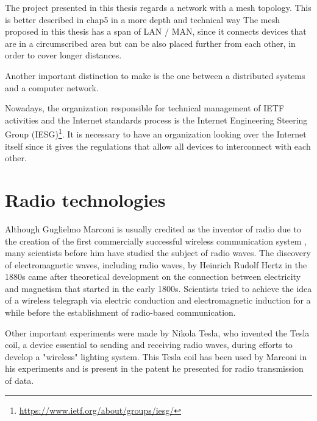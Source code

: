 	The project presented in this thesis regards a network with a mesh topology.
	This is better described in chap5 in a more depth and technical way
	The mesh proposed in this thesis has a span of LAN / MAN, since it connects devices that are in a circumscribed area but can be also placed further from each other, in order to cover longer distances.
	
	Another important distinction to make is the one between a distributed systems and a computer network.
	
	Nowadays, the organization responsible for technical management of IETF activities and the Internet standards process is the Internet Engineering Steering Group (IESG)\footnote{\url{https://www.ietf.org/about/groups/iesg/}}.
	It is necessary to have an organization looking over the Internet itself since it gives the regulations that allow all devices to interconnect with each other.
	
	\newpage	

\section{Radio technologies}\label{sec:radio_tech}
	
	Although Guglielmo Marconi is usually credited as the inventor of radio due to the creation of the first commercially successful wireless communication system \cite{4137304}, many scientists before him have studied the subject of radio waves.
	The discovery of electromagnetic waves, including radio waves, by Heinrich Rudolf Hertz in the 1880s came after theoretical development on the connection between electricity and magnetism that started in the early 1800s.
	Scientists tried to achieve the idea of a wireless telegraph via electric conduction and electromagnetic induction for a while before the establishment of radio-based communication.
	
	Other important experiments were made by Nikola Tesla, who invented the Tesla coil, a device essential to sending and receiving radio waves, during efforts to develop a "wireless" lighting system.
	This Tesla coil has been used by Marconi in his experiments and is present in the patent he presented for radio transmission of data.
	
